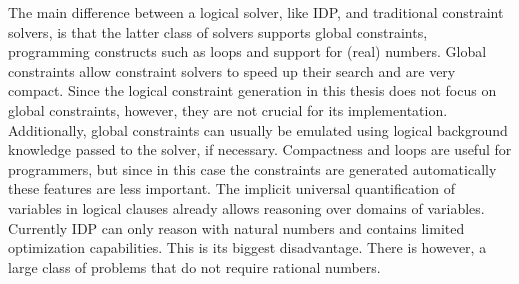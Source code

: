 The main difference between a logical solver, like IDP, and traditional constraint solvers, is that the latter class of solvers supports global constraints, programming constructs such as loops and support for (real) numbers.
Global constraints allow constraint solvers to speed up their search and are very compact.
Since the logical constraint generation in this thesis does not focus on global constraints, however, they are not crucial for its implementation.
Additionally, global constraints can usually be emulated using logical background knowledge passed to the solver, if necessary.
Compactness and loops are useful for programmers, but since in this case the constraints are generated automatically these features are less important.
The implicit universal quantification of variables in logical clauses already allows reasoning over domains of variables.
Currently IDP can only reason with natural numbers and contains limited optimization capabilities.
This is its biggest disadvantage.
There is however, a large class of problems that do not require rational numbers.